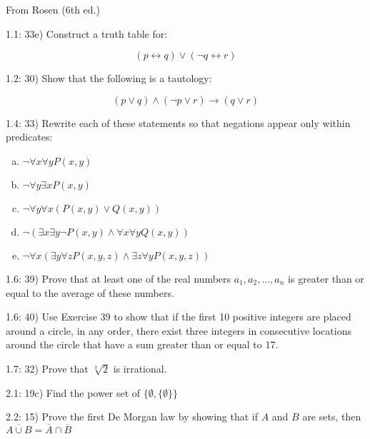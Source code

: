 \documentclass{report}
\begin{document}
From Rosen (6th ed.)

1.1: 33e) Construct a truth table for:

\[
(p \leftrightarrow q) \vee (\neg q \leftrightarrow r)
\]

1.2: 30) Show that the following is a tautology:

\[
(p \vee q) \wedge (\neg p \vee r) \rightarrow (q \vee r)
\]

1.4: 33) Rewrite each of these statements so that negations appear only within predicates:


\begin{enumerate}[a)]
\item $ \neg \forall x \forall y P(x,y) $
\item $ \neg \forall y \exists x P(x,y) $
\item $ \neg \forall y \forall x (P(x,y) \vee Q(x,y)) $
\item $ \neg ( \exists x \exists y \neg P(x,y) \wedge \forall x \forall y Q(x,y)) $
\item $ \neg \forall x ( \exists y \forall z P(x,y,z) \wedge \exists z \forall y P(x,y,z)) $
\end{enumerate}

1.6: 39) Prove that at least one of the real numbers $a_1,a_2,...,a_n$ is greater than or equal to the average of these numbers.

1.6: 40) Use Exercise 39 to show that if the first 10 positive integers are placed around a circle, in any order, there exist three integers in consecutive locations around the circle that have a sum greater than or equal to 17.

1.7: 32) Prove that $\sqrt[3]{2}$ is irrational.

2.1: 19c) Find the power set of $ \{ \emptyset , \{ \emptyset \} \} $

2.2: 15) Prove the first De Morgan law by showing that if $A$ and $B$
are sets, then $ \overline{ A \cup B } = \overline{A} \cap \overline{B} $
\end{document}

